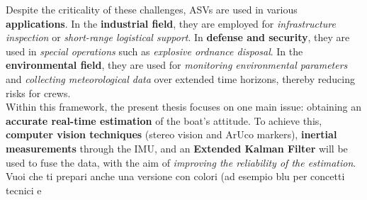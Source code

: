 Despite the criticality of these challenges, ASVs are used in various \textbf{applications}. In the \textbf{industrial field}, they are employed for \textit{infrastructure inspection} or \textit{short-range logistical support}. In \textbf{defense and security}, they are used in \textit{special operations} such as \textit{explosive ordnance disposal}. In the \textbf{environmental field}, they are used for \textit{monitoring environmental parameters} and \textit{collecting meteorological data} over extended time horizons, thereby reducing risks for crews.\\

Within this framework, the present thesis focuses on one main issue: obtaining an \textbf{accurate real-time estimation} of the boat’s attitude. To achieve this, \textbf{computer vision techniques} (stereo vision and ArUco markers), \textbf{inertial measurements} through the IMU, and an \textbf{Extended Kalman Filter} will be used to fuse the data, with the aim of \textit{improving the reliability of the estimation}.
Vuoi che ti prepari anche una versione con colori (ad esempio blu per concetti tecnici e